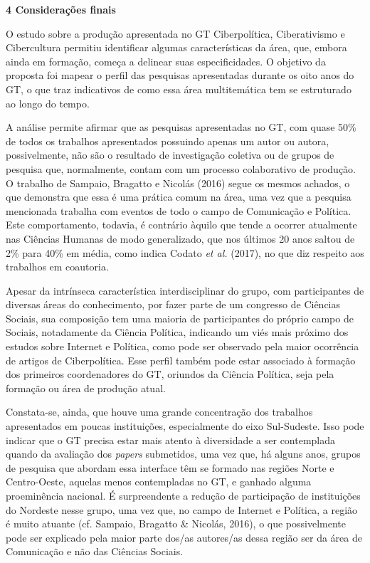 \textbf{4 Considerações finais}

O estudo sobre a produção apresentada no GT Ciberpolítica, Ciberativismo
e Cibercultura permitiu identificar algumas características da área,
que, embora ainda em formação, começa a delinear suas especificidades. O
objetivo da proposta foi mapear o perfil das pesquisas apresentadas
durante os oito anos do GT, o que traz indicativos de como essa área
multitemática tem se estruturado ao longo do tempo.

A análise permite afirmar que as pesquisas apresentadas no GT, com quase
50\% de todos os trabalhos apresentados possuindo apenas um autor ou
autora, possivelmente, não são o resultado de investigação coletiva ou
de grupos de pesquisa que, normalmente, contam com um processo
colaborativo de produção. O trabalho de Sampaio, Bragatto e Nicolás
(2016) segue os mesmos achados, o que demonstra que essa é uma prática
comum na área, uma vez que a pesquisa mencionada trabalha com eventos de
todo o campo de Comunicação e Política. Este comportamento, todavia, é
contrário àquilo que tende a ocorrer atualmente nas Ciências Humanas de
modo generalizado, que nos últimos 20 anos saltou de 2\% para 40\% em
média, como indica Codato \emph{et al.} (2017), no que diz respeito aos
trabalhos em coautoria.

Apesar da intrínseca característica interdisciplinar do grupo, com
participantes de diversas áreas do conhecimento, por fazer parte de um
congresso de Ciências Sociais, sua composição tem uma maioria de
participantes do próprio campo de Sociais, notadamente da Ciência
Política, indicando um viés mais próximo dos estudos sobre Internet e
Política, como pode ser observado pela maior ocorrência de artigos de
Ciberpolítica. Esse perfil também pode estar associado à formação dos
primeiros coordenadores do GT, oriundos da Ciência Política, seja pela
formação ou área de produção atual.

Constata-se, ainda, que houve uma grande concentração dos trabalhos
apresentados em poucas instituições, especialmente do eixo Sul-Sudeste.
Isso pode indicar que o GT precisa estar mais atento à diversidade a ser
contemplada quando da avaliação dos \emph{papers} submetidos, uma vez
que, há alguns anos, grupos de pesquisa que abordam essa interface têm
se formado nas regiões Norte e Centro-Oeste, aquelas menos contempladas
no GT, e ganhado alguma proeminência nacional. É surpreendente a redução
de participação de instituições do Nordeste nesse grupo, uma vez que, no
campo de Internet e Política, a região é muito atuante (cf. Sampaio,
Bragatto \& Nicolás, 2016), o que possivelmente pode ser explicado pela
maior parte dos/as autores/as dessa região ser da área de Comunicação e
não das Ciências Sociais.

